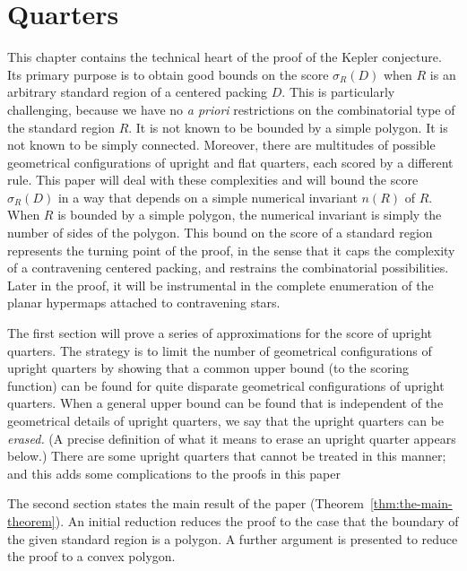 
\chapter{Quarters} %
    \label{sec:upright}

This chapter contains the technical heart of the proof of the Kepler
conjecture.  Its primary purpose is to obtain good bounds on the
score $\sigma_R(D)$ when $R$ is an arbitrary standard region of a
centered packing $D$.  This is particularly challenging, because
we have no {\it a priori} restrictions on the combinatorial type
of the standard region $R$.  It is not known to be bounded by a
simple polygon.  It is not known to be simply connected. Moreover,
there are multitudes of possible geometrical configurations of
upright and flat quarters, each scored by a different rule.  This
paper will deal with these complexities and will bound the score
$\sigma_R(D)$ in a way that depends on a simple numerical
invariant $n(R)$ of $R$. When $R$ is bounded by a simple polygon,
the numerical invariant is simply the number of sides of the
polygon. This bound on the score of a standard region represents
the turning point of the proof, in the sense that it caps the
complexity of a contravening centered packing, and restrains the
combinatorial possibilities. Later in the proof, it will be
instrumental in the complete enumeration of the planar hypermaps
attached to contravening stars.

The first section will prove a series of approximations for the
score of upright quarters.  The strategy is to limit the number of
geometrical configurations of upright quarters by showing that a
common upper bound (to the scoring function) can be found for
quite disparate geometrical configurations of upright quarters.
When a general upper bound can be found that is independent of the
geometrical details of upright quarters, we say that the upright
quarters can be {\it erased.}  (A precise definition of what it
means to erase an upright quarter appears below.)  There are some
upright quarters that cannot be treated in this manner; and this
adds some complications to the proofs in this paper

The second section states the main result of the paper
(Theorem~\ref{thm:the-main-theorem}).  An initial reduction
reduces the proof to the case that the boundary of the given
standard region is a polygon.  A further argument is presented to
reduce the proof to a convex polygon.


